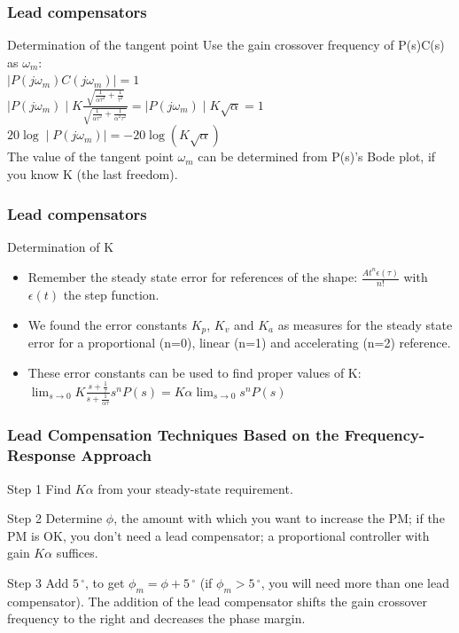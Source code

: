 \begin{frame}
\frametitle{Lead compensators}
\begin{block}{Determination of the tangent point}
	Use the gain crossover frequency of P(s)C(s) as $\omega_m$: \\
	$\mid P(j\omega_m)C(j\omega_m) \mid = 1$ \\
	$\mid P(j\omega_m) \mid K \frac{\sqrt{\frac{1}{\alpha\tau^2} + \frac{1}{\tau^2}}}{\sqrt{\frac{1}{\alpha\tau^2} + \frac{1}{\alpha^2\tau^2}}} = \mid P(j\omega_m) \mid K \sqrt{\alpha} = 1$ \\
	$20\log \mid P(j\omega_m) \mid = -20\log (K\sqrt{\alpha})$ \\
	The value of the tangent point $\omega_m$ can be determined from P(s)'s Bode plot, if you know K (the last freedom).
\end{block}
\end{frame}	

\begin{frame}
\frametitle{Lead compensators}
\begin{block}{Determination of K}
	\begin{itemize}
		\item Remember the steady state error for references of the shape: $\frac{At^n\epsilon(\tau)}{n!}$ with $\epsilon(t)$ the step function.
		\item We found the error constants $K_p$, $K_v$ and $K_a$ as measures for the steady state error for a proportional (n=0), linear (n=1) and accelerating (n=2) reference.
		\item These error constants can be used to find proper values of K: 
		$\lim_{s \to 0} K \frac{s + \frac{1}{\tau}}{s + \frac{1}{\alpha\tau}}s^nP(s) = K\alpha \lim_{s \to 0}s^nP(s)$
	\end{itemize}
\end{block}
\end{frame}

\begin{frame}
	\frametitle{Lead Compensation Techniques Based on the Frequency-Response Approach}
	\begin{block}{Step 1}
	Find $K\alpha$ from your steady-state requirement.
	\end{block}
	\begin{block}{Step 2}
	Determine $\phi$, the amount with which you want to increase the PM; if the PM is OK, you don’t need a lead compensator; a proportional controller with gain $K\alpha$ suffices.
	\end{block}
	\begin{block}{Step 3}
	Add $5\,^{\circ}$, to get $\phi_m = \phi + 5\,^{\circ}$ (if $\phi_m > 5\,^{\circ}$, you will need more than one lead compensator). The addition of the lead compensator shifts the gain crossover frequency to the right and decreases the
	phase margin.
	\end{block}
\end{frame}

